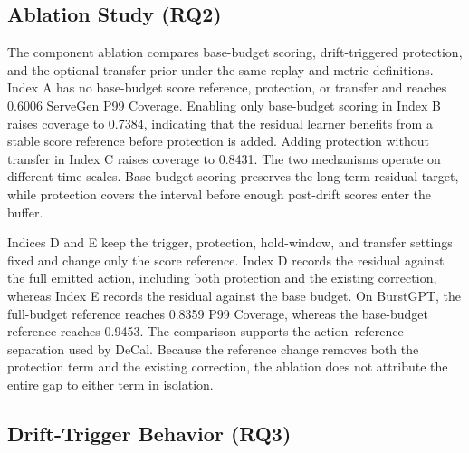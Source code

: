 \documentclass[sigplan,10pt, anonymous]{acmart}
\begin{document}
\subsection{Ablation Study (RQ2)}
\label{sec:ablation}

The component ablation compares base-budget scoring, drift-triggered protection, and the optional transfer prior under the same replay and metric definitions. Index A has no base-budget score reference, protection, or transfer and reaches 0.6006 ServeGen P99 Coverage. Enabling only base-budget scoring in Index B raises coverage to 0.7384, indicating that the residual learner benefits from a stable score reference before protection is added. Adding protection without transfer in Index C raises coverage to 0.8431. The two mechanisms operate on different time scales. Base-budget scoring preserves the long-term residual target, while protection covers the interval before enough post-drift scores enter the buffer.

Indices D and E keep the trigger, protection, hold-window, and transfer settings fixed and change only the score reference. Index D records the residual against the full emitted action, including both protection and the existing correction, whereas Index E records the residual against the base budget. On BurstGPT, the full-budget reference reaches 0.8359 P99 Coverage, whereas the base-budget reference reaches 0.9453. The comparison supports the action--reference separation used by DeCal. Because the reference change removes both the protection term and the existing correction, the ablation does not attribute the entire gap to either term in isolation.



\subsection{Drift-Trigger Behavior (RQ3)}
\label{sec:drift-trigger-behavior}
\end{document}
